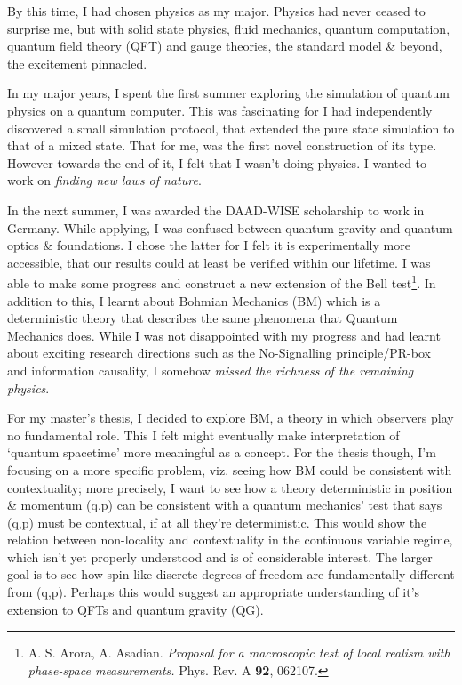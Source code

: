 By this time, I had chosen physics as my major. Physics had never ceased to surprise me, but with solid state physics, fluid mechanics, quantum computation, quantum field theory (QFT) and gauge theories, the standard model \& beyond, the excitement pinnacled. 


In my major years, I spent the first summer exploring the simulation of quantum physics  on a quantum computer. This was fascinating for I had independently discovered a small simulation protocol, that extended the pure state simulation to that of a mixed state. That for me, was the first novel construction of its type. However towards the end of it, I felt that I wasn't doing physics. I wanted to work on \emph{finding new laws of nature}.


In the next summer, I was awarded the DAAD-WISE scholarship to work in Germany. While applying, I was confused between quantum gravity and quantum optics \& foundations. I chose the latter for I felt it is experimentally more accessible, that our results could at least be verified within our lifetime. I was able to make some progress and construct a new extension of the Bell test\footnote{A. S. Arora, A. Asadian. \emph{Proposal for a macroscopic test of local realism with phase-space measurements.} Phys. Rev. A \textbf{92}, 062107.}. 
In addition to this, I learnt about Bohmian Mechanics (BM) which is a deterministic theory that describes the same phenomena that Quantum Mechanics does. While I was not disappointed with my progress and had learnt about exciting research directions such as the No-Signalling principle/PR-box and information causality, I somehow \emph{missed the richness of the remaining physics}.

For my master's thesis, I decided to explore BM, a theory in which observers play no fundamental role. This I felt might eventually make interpretation of `quantum spacetime' more meaningful as a concept. For the thesis though, I'm focusing on a more specific problem, viz. seeing how BM could be consistent with contextuality; more precisely, I want to see how a theory deterministic in position \& momentum (q,p) can be consistent with a quantum mechanics' test that says (q,p) must be contextual, if at all they're deterministic. This would show the relation between non-locality and contextuality in the continuous variable regime, which isn't yet properly understood and is of considerable interest. The larger goal is to see how spin like discrete degrees of freedom are fundamentally different from (q,p). Perhaps this would suggest an appropriate understanding of it's extension to QFTs and quantum gravity (QG).

